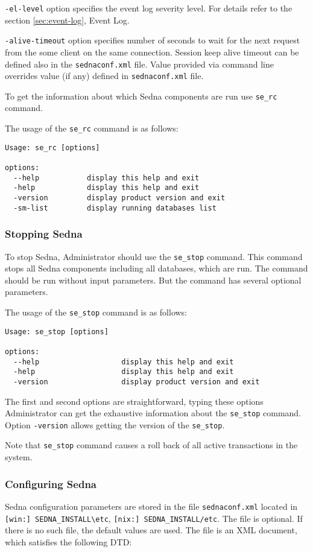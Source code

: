 \documentclass[a4paper,12pt]{article}
\begin{document}
\verb!-el-level! option specifies the event log severity level. For details refer to the section \ref{sec:event-log}, Event Log.

\verb!-alive-timeout! option specifies number of seconds to wait for the next request from the some client on the same connection.
Session keep alive timeout can be defined also in the \verb!sednaconf.xml! file.
Value provided via command line overrides value (if any) defined in \verb!sednaconf.xml! file.

To get the information about which Sedna components are run use \verb!se_rc! command.

The usage of the \verb!se_rc! command is as follows:

\begin{verbatim}
Usage: se_rc [options]

options:
  --help		   display this help and exit
  -help			   display this help and exit
  -version		   display product version and exit
  -sm-list         display running databases list
\end{verbatim}


\subsubsection{Stopping Sedna}

To stop Sedna, Administrator should use the \verb!se_stop! command. This command stops all Sedna components including all databases, which are run. The command should be run without input parameters. But the command has several optional parameters.

The usage of the \verb!se_stop! command is as follows:

\begin{verbatim}
Usage: se_stop [options]

options:
  --help                   display this help and exit
  -help                    display this help and exit
  -version                 display product version and exit
\end{verbatim}
The first and second options are straightforward, typing these options Administrator can get the exhaustive information about the \verb!se_stop! command. Option \verb!-version! allows getting the version of the \verb!se_stop!.

Note that \verb!se_stop! command causes a roll back of all active transactions in the system.

\subsubsection{Configuring Sedna}
\label{sec:ConfigSedna}
Sedna configuration parameters are stored in the file \verb!sednaconf.xml! located in
\verb![win:] SEDNA_INSTALL\etc!, \verb![nix:] SEDNA_INSTALL/etc!. The file is optional. If there is no such file, the default values are used.
The file is an XML document, which satisfies the following DTD:
\end{document}
